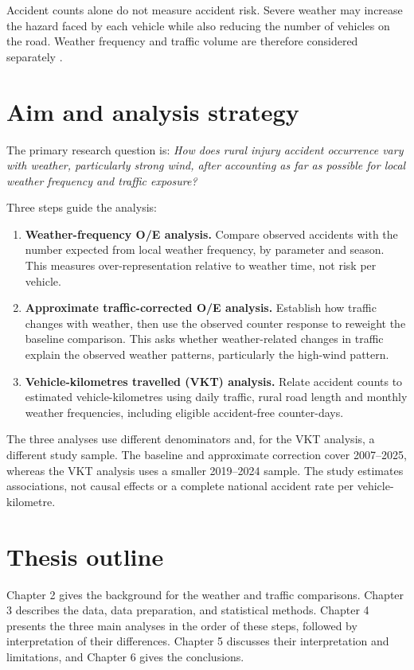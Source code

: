 Accident counts alone do not measure accident risk. Severe weather may increase
the hazard faced by each vehicle while also reducing the number of vehicles on
the road. Weather frequency and traffic volume are therefore considered
separately \citep{andrey2003,lord2010,washington2020}.

\section{Aim and analysis strategy}

The primary research question is: \emph{How does rural injury accident
occurrence vary with weather, particularly strong wind, after accounting as
far as possible for local weather frequency and traffic exposure?}

Three steps guide the analysis:
\begin{enumerate}
  \item \textbf{Weather-frequency O/E analysis.} Compare observed accidents
  with the number expected from local weather frequency, by parameter and season.
  This measures over-representation relative to weather time, not risk per vehicle.
  \item \textbf{Approximate traffic-corrected O/E analysis.} Establish how traffic
  changes with weather, then use the observed counter response to reweight the
  baseline comparison. This asks whether weather-related changes in traffic explain the observed weather patterns, particularly the high-wind pattern.
  \item \textbf{Vehicle-kilometres travelled (VKT) analysis.} Relate accident counts to
  estimated vehicle-kilometres using daily traffic, rural road length and monthly
  weather frequencies, including eligible accident-free counter-days.
\end{enumerate}

The three analyses use different denominators and, for the VKT analysis, a different study sample. The baseline and approximate correction cover 2007--2025, whereas the
VKT analysis uses a smaller 2019--2024 sample. The study estimates associations, not causal effects
or a complete national accident rate per vehicle-kilometre.

\section{Thesis outline}

Chapter 2 gives the background for the weather and traffic comparisons.
Chapter 3 describes the data, data preparation, and statistical methods.
Chapter 4 presents the three main analyses in the order of these steps, followed
by interpretation of their differences. Chapter 5 discusses their interpretation and limitations,
and Chapter 6 gives the conclusions.

